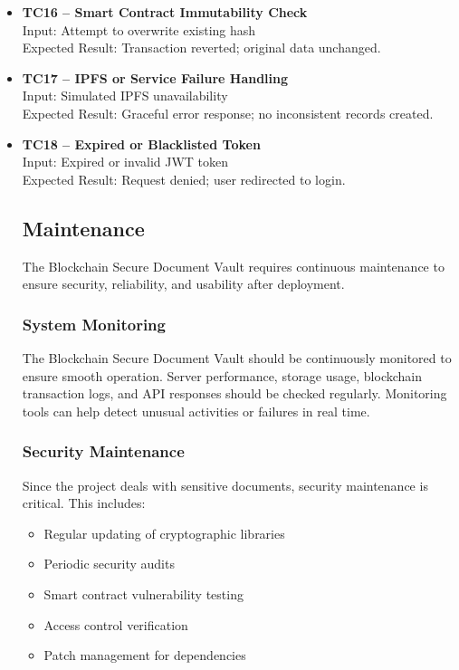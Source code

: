 \documentclass[12pt]{article}
\begin{document}
\begin{itemize}
\item \textbf{TC16 -- Smart Contract Immutability Check} \\
Input: Attempt to overwrite existing hash \\
Expected Result: Transaction reverted; original data unchanged.

\item \textbf{TC17 -- IPFS or Service Failure Handling} \\
Input: Simulated IPFS unavailability \\
Expected Result: Graceful error response; no inconsistent records created.

\item \textbf{TC18 -- Expired or Blacklisted Token} \\
Input: Expired or invalid JWT token \\
Expected Result: Request denied; user redirected to login.

\subsection{Maintenance}

The Blockchain Secure Document Vault requires continuous maintenance to ensure security, reliability, and usability after deployment.

\subsubsection{System Monitoring}
The Blockchain Secure Document Vault should be continuously monitored to ensure smooth operation. Server performance, storage usage, blockchain transaction logs, and API responses should be checked regularly. Monitoring tools can help detect unusual activities or failures in real time.

\subsubsection{Security Maintenance}
Since the project deals with sensitive documents, security maintenance is critical. This includes:

\begin{itemize}
    \item Regular updating of cryptographic libraries
    \item Periodic security audits
    \item Smart contract vulnerability testing
    \item Access control verification
    \item Patch management for dependencies
\end{itemize}


\end{itemize}
\end{document}
